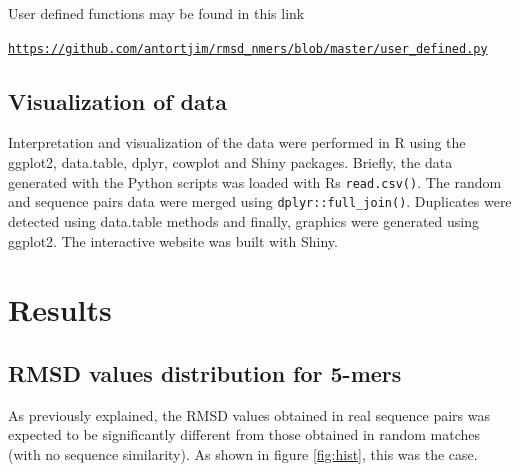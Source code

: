 \documentclass[a4paper, 11pt]{article} %
\begin{document}
User defined functions may be found in this link

\begin{center}
\texttt{\href{https://github.com/antortjim/rmsd\_nmers/blob/master/user\_defined.py}{https://github.com/antortjim/rmsd\_nmers/blob/master/user\_defined.py}}
\end{center}

\subsection{Visualization of data}

Interpretation and visualization of the data were performed in R using the ggplot2, data.table, dplyr, cowplot and Shiny packages. Briefly, the data generated with the Python scripts was loaded with R\textquotesingle s \texttt{read.csv()}. The random and sequence pairs data were merged using \texttt{dplyr::full\_join()}. Duplicates were detected using data.table methods and finally, graphics were generated using ggplot2. The interactive website was built with Shiny.

\section{Results}


\subsection{RMSD values distribution for 5-mers}

As previously explained, the RMSD values obtained in real sequence pairs was expected to be significantly different from those obtained in random matches (with no sequence similarity). As shown in figure \ref{fig:hist}, this was the case. 
\end{document}
